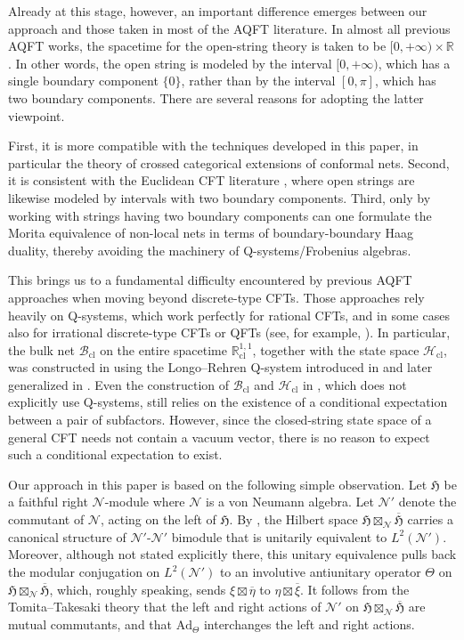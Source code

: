 \documentclass[11pt,b5paper,notitlepage]{article}
\theoremstyle{definition}
\theoremstyle{plain}
\newcommand{\fk}{\mathfrak}
\newcommand{\mc}{\mathcal}
\newcommand{\ovl}{\overline}
\newcommand{\Ad}{\mathrm{Ad}}
\newcommand{\Rbb}{\mathbb R}
\newcommand{\MN}{\mathcal N}
\newcommand{\Rcl}{\mathbb R^{1,1}_{\mathrm{cl}}}
\newcommand{\Bcl}{\mathcal B_{\mathrm{cl}}}
\newcommand{\Hcl}{\mathcal H_{\mathrm{cl}}}
\numberwithin{equation}{section}
\begin{document}
Already at this stage, however, an important difference emerges between our approach and those taken in most of the AQFT literature. In almost all previous AQFT works, the spacetime for the open-string theory is taken to be $[0,+\infty)\times\Rbb$. In other words, the open string is modeled by the interval $[0,+\infty)$, which has a single boundary component $\{0\}$, rather than by the interval $[0,\pi]$, which has two boundary components. There are several reasons for adopting the latter viewpoint.

First, it is more compatible with the techniques developed in this paper, in particular the theory of crossed categorical extensions of conformal nets. Second, it is consistent with the Euclidean CFT literature \cite{FFFS02,FRS02,FRS05,FFRS06,HK07,Kong07,Kong08a,Kong08b}, where open strings are likewise modeled by intervals with two boundary components. Third, only by working with strings having two boundary components can one formulate the Morita equivalence of non-local nets in terms of boundary-boundary Haag duality, thereby avoiding the machinery of Q-systems/Frobenius algebras.


This brings us to a fundamental difficulty encountered by previous AQFT approaches when moving beyond discrete-type CFTs. Those approaches rely heavily on Q-systems, which work perfectly for rational CFTs, and in some cases also for irrational discrete-type CFTs or QFTs (see, for example, \cite{Mas00,DVG18}). In particular, the bulk net $\Bcl$ on the entire spacetime $\Rcl$, together with the state space $\Hcl$, was constructed in \cite{LR04} using the Longo--Rehren Q-system introduced in \cite{LR95} and later generalized in \cite{Reh00}. Even the construction of $\Bcl$ and $\Hcl$ in \cite{LR09}, which does not explicitly use Q-systems, still relies on the existence of a conditional expectation between a pair of subfactors. However, since the closed-string state space of a general CFT needs not contain a vacuum vector, there is no reason to expect such a conditional expectation to exist.


Our approach in this paper is based on the following simple observation. Let $\fk H$ be a faithful right $\MN$-module where $\MN$ is a von Neumann algebra. Let $\mc N'$ denote the commutant of $\MN$, acting on the left of $\fk H$. By \cite[Sec. IX.3]{Tak03}, the Hilbert space $\fk H\boxtimes_\MN\ovl{\fk H}$ carries a canonical structure of $\MN'$-$\MN'$ bimodule that is unitarily equivalent to $L^2(\MN')$. Moreover, although not stated explicitly there, this unitary equivalence pulls back the modular conjugation on $L^2(\MN')$ to an involutive antiunitary operator $\Theta$ on $\fk H\boxtimes_\MN\ovl{\fk H}$, which, roughly speaking, sends $\xi\boxtimes\ovl\eta$ to $\eta\boxtimes\ovl\xi$. It follows from the Tomita--Takesaki theory that the left and right actions of $\MN'$ on $\fk H\boxtimes_\MN\ovl{\fk H}$ are mutual commutants, and that $\Ad_\Theta$ interchanges the left and right actions.
\end{document}
